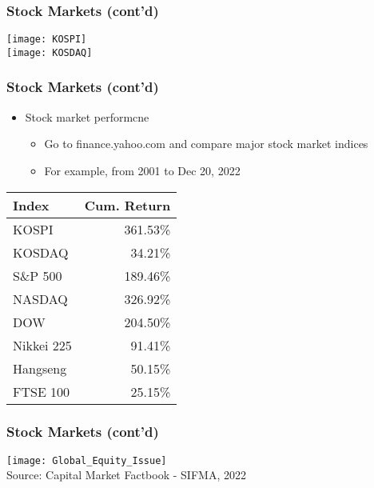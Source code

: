 \documentclass[10pt]{beamer}
\begin{document}
	
	
	\begin{frame}
		\frametitle{Stock Markets (cont'd)} %
		\begin{center}
			\texttt{[image: KOSPI]}\\
			\texttt{[image: KOSDAQ]}
		\end{center}
		
	\end{frame}	
	
	
	
	
	\begin{frame}
		\frametitle{Stock Markets (cont'd)}
		
		\begin{itemize} \vspace{5pt} \itemsep10pt
			\item Stock market performcne
			\begin{itemize} \vspace{5pt} \itemsep10pt
				\item Go to finance.yahoo.com and compare major stock market indices 
				\item For example, from 2001 to Dec 20, 2022 
			\end{itemize}
			
		\end{itemize}
		
		\begin{table}[]
			\begin{tabular}{lr}
				Index      & Cum. Return \\ \hline
				KOSPI      & 361.53\%    \\
				KOSDAQ     & 34.21\%     \\
				S\&P 500   & 189.46\%    \\
				NASDAQ     & 326.92\%    \\
				DOW        & 204.50\%    \\
				Nikkei 225 & 91.41\%     \\
				Hangseng   & 50.15\%     \\
				FTSE 100   & 25.15\%    
			\end{tabular}
		\end{table}
		
		
	\end{frame}
	
	
	
	
	\begin{frame}
		\frametitle{Stock Markets (cont'd)} %
		\begin{center}
			\texttt{[image: Global\_Equity\_Issue]} \\
			{\scriptsize Source: Capital Market Factbook - SIFMA, 2022}		
		\end{center}
		
	\end{frame}	
	
\end{document}
